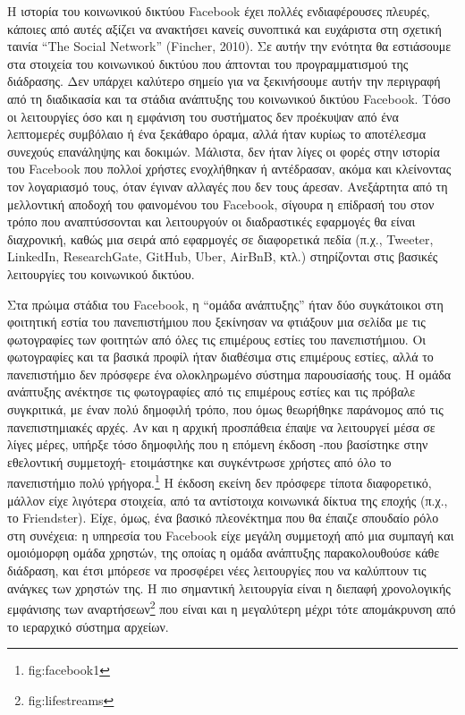 \documentclass[
]{article}
\begin{document}
Η ιστορία του κοινωνικού δικτύου Facebook έχει πολλές ενδιαφέρουσες
πλευρές, κάποιες από αυτές αξίζει να ανακτήσει κανείς συνοπτικά και
ευχάριστα στη σχετική ταινία ``The Social Network'' (Fincher, 2010). Σε
αυτήν την ενότητα θα εστιάσουμε στα στοιχεία του κοινωνικού δικτύου που
άπτονται του προγραμματισμού της διάδρασης. Δεν υπάρχει καλύτερο σημείο
για να ξεκινήσουμε αυτήν την περιγραφή από τη διαδικασία και τα στάδια
ανάπτυξης του κοινωνικού δικτύου Facebook. Τόσο οι λειτουργίες όσο και η
εμφάνιση του συστήματος δεν προέκυψαν από ένα λεπτομερές συμβόλαιο ή ένα
ξεκάθαρο όραμα, αλλά ήταν κυρίως το αποτέλεσμα συνεχούς επανάληψης και
δοκιμών. Μάλιστα, δεν ήταν λίγες οι φορές στην ιστορία του Facebook που
πολλοί χρήστες ενοχλήθηκαν ή αντέδρασαν, ακόμα και κλείνοντας τον
λογαριασμό τους, όταν έγιναν αλλαγές που δεν τους άρεσαν. Ανεξάρτητα από
τη μελλοντική αποδοχή του φαινομένου του Facebook, σίγουρα η επίδρασή
του στον τρόπο που αναπτύσσονται και λειτουργούν οι διαδραστικές
εφαρμογές θα είναι διαχρονική, καθώς μια σειρά από εφαρμογές σε
διαφορετικά πεδία (π.χ., Tweeter, LinkedIn, ResearchGate, GitHub, Uber,
AirBnB, κτλ.) στηρίζονται στις βασικές λειτουργίες του κοινωνικού
δικτύου.

Στα πρώιμα στάδια του Facebook, η ``ομάδα ανάπτυξης'' ήταν δύο
συγκάτοικοι στη φοιτητική εστία του πανεπιστήμιου που ξεκίνησαν να
φτιάξουν μια σελίδα με τις φωτογραφίες των φοιτητών από όλες τις
επιμέρους εστίες του πανεπιστήμιου. Οι φωτογραφίες και τα βασικά προφίλ
ήταν διαθέσιμα στις επιμέρους εστίες, αλλά το πανεπιστήμιο δεν πρόσφερε
ένα ολοκληρωμένο σύστημα παρουσίασής τους. Η ομάδα ανάπτυξης ανέκτησε
τις φωτογραφίες από τις επιμέρους εστίες και τις πρόβαλε συγκριτικά, με
έναν πολύ δημοφιλή τρόπο, που όμως θεωρήθηκε παράνομος από τις
πανεπιστημιακές αρχές. Αν και η αρχική προσπάθεια έπαψε να λειτουργεί
μέσα σε λίγες μέρες, υπήρξε τόσο δημοφιλής που η επόμενη έκδοση -που
βασίστηκε στην εθελοντική συμμετοχή- ετοιμάστηκε και συγκέντρωσε χρήστες
από όλο το πανεπιστήμιο πολύ γρήγορα.\footnote{fig:facebook1} Η έκδοση
εκείνη δεν πρόσφερε τίποτα διαφορετικό, μάλλον είχε λιγότερα στοιχεία,
από τα αντίστοιχα κοινωνικά δίκτυα της εποχής (π.χ., το Friendster).
Είχε, όμως, ένα βασικό πλεονέκτημα που θα έπαιζε σπουδαίο ρόλο στη
συνέχεια: η υπηρεσία του Facebook είχε μεγάλη συμμετοχή από μια συμπαγή
και ομοιόμορφη ομάδα χρηστών, της οποίας η ομάδα ανάπτυξης
παρακολουθούσε κάθε διάδραση, και έτσι μπόρεσε να προσφέρει νέες
λειτουργίες που να καλύπτουν τις ανάγκες των χρηστών της. Η πιο
σημαντική λειτουργία είναι η διεπαφή χρονολογικής εμφάνισης των
αναρτήσεων\footnote{fig:lifestreams} που είναι και η μεγαλύτερη μέχρι
τότε απομάκρυνση από το ιεραρχικό σύστημα αρχείων.
\end{document}
